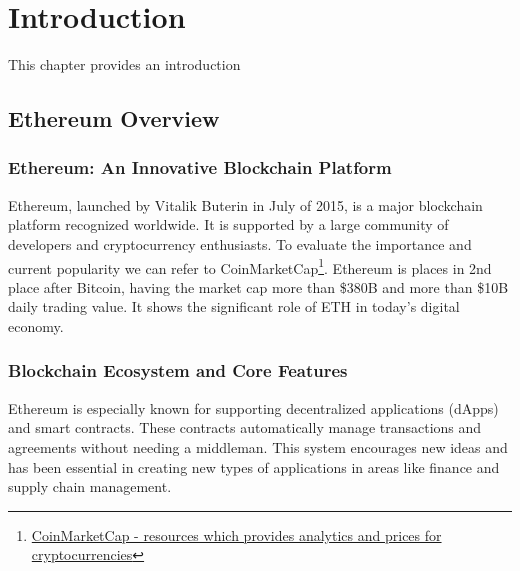 \chapter{Introduction}
\label{chap:intro}

This chapter provides an introduction 




\section{Ethereum Overview}

\subsection{Ethereum: An Innovative Blockchain Platform}
Ethereum, launched by Vitalik Buterin in July of 2015, is a major blockchain platform recognized worldwide. It is supported by a large community of developers and cryptocurrency enthusiasts. To evaluate the importance and current popularity we can refer to CoinMarketCap\footnote{\href{https://coinmarketcap.com/}{CoinMarketCap - resources which provides analytics and prices for cryptocurrencies}}. Ethereum is places in 2nd place after Bitcoin, having the market cap more than \$380B and more than \$10B daily trading value. It shows the significant role of ETH in today’s digital economy.

\subsection{Blockchain Ecosystem and Core Features}
Ethereum is especially known for supporting decentralized applications (dApps) and smart contracts. These contracts automatically manage transactions and agreements without needing a middleman. This system encourages new ideas and has been essential in creating new types of applications in areas like finance and supply chain management.

